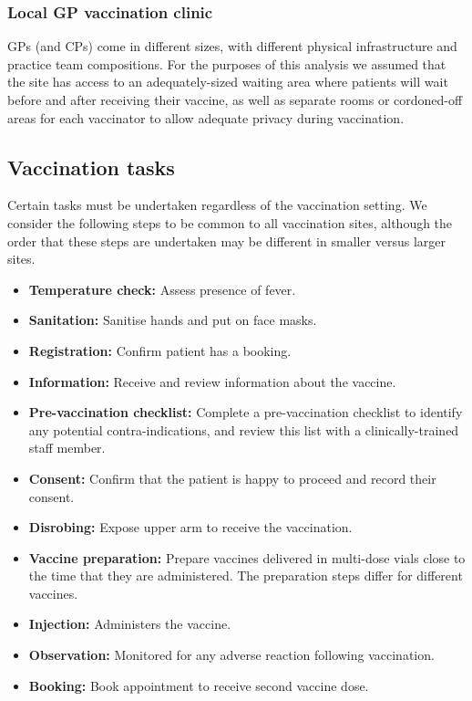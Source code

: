\documentclass{article}
\begin{document}
\hypertarget{local-gp-vaccination-clinic}{%
\subsubsection{Local GP vaccination
clinic}\label{local-gp-vaccination-clinic}}

GPs (and CPs) come in different sizes, with different physical
infrastructure and practice team compositions. For the purposes of this
analysis we assumed that the site has access to an adequately-sized
waiting area where patients will wait before and after receiving their
vaccine, as well as separate rooms or cordoned-off areas for each
vaccinator to allow adequate privacy during vaccination.

\hypertarget{vaccination-tasks}{%
\subsection{Vaccination tasks}\label{vaccination-tasks}}

Certain tasks must be undertaken regardless of the vaccination setting.
We consider the following steps to be common to all vaccination sites,
although the order that these steps are undertaken may be different in
smaller versus larger sites.

\begin{itemize}
\tightlist
\item
  \textbf{Temperature check:} Assess presence of fever.
\item
  \textbf{Sanitation:} Sanitise hands and put on face masks.
\item
  \textbf{Registration:} Confirm patient has a booking.
\item
  \textbf{Information:} Receive and review information about the
  vaccine.
\item
  \textbf{Pre-vaccination checklist:} Complete a pre-vaccination
  checklist to identify any potential contra-indications, and review
  this list with a clinically-trained staff member.
\item
  \textbf{Consent:} Confirm that the patient is happy to proceed and
  record their consent.
\item
  \textbf{Disrobing:} Expose upper arm to receive the vaccination.
\item
  \textbf{Vaccine preparation:} Prepare vaccines delivered in multi-dose
  vials close to the time that they are administered. The preparation
  steps differ for different vaccines.
\item
  \textbf{Injection:} Administers the vaccine.
\item
  \textbf{Observation:} Monitored for any adverse reaction following
  vaccination.\\
\item
  \textbf{Booking:} Book appointment to receive second vaccine dose.
\end{itemize}
\end{document}
